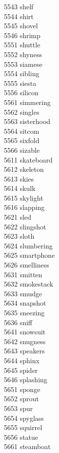 5543 shelf \\
5544 shirt \\
5545 shovel \\
5546 shrimp \\
5551 shuttle \\
5552 shyness \\
5553 siamese \\
5554 sibling \\
5555 siesta \\
5556 silicon \\
5561 simmering \\
5562 singles \\
5563 sisterhood \\
5564 sitcom \\
5565 sixfold \\
5566 sizable \\
5611 skateboard \\
5612 skeleton \\
5613 skies \\
5614 skulk \\
5615 skylight \\
5616 slapping \\
5621 sled \\
5622 slingshot \\
5623 sloth \\
5624 slumbering \\
5625 smartphone \\
5626 smelliness \\
5631 smitten \\
5632 smokestack \\
5633 smudge \\
5634 snapshot \\
5635 sneezing \\
5636 sniff \\
5641 snowsuit \\
5642 snugness \\
5643 speakers \\
5644 sphinx \\
5645 spider \\
5646 splashing \\
5651 sponge \\
5652 sprout \\
5653 spur \\
5654 spyglass \\
5655 squirrel \\
5656 statue \\
5661 steamboat \\
